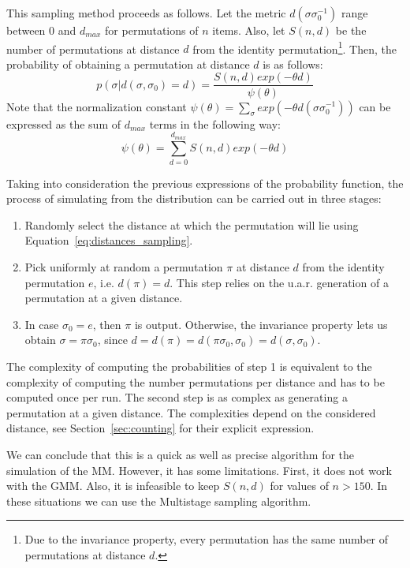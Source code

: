 \documentclass[article,nojss]{jss}
\begin{document}
This sampling method proceeds as follows. Let the metric $d(\sigma \sigma_0^{-1})$ range between  $0$ and $d_{max}$ for permutations of $n$ items. Also, let $S(n,d)$ be the number of permutations at distance $d$ from the identity permutation\footnote{Due to the invariance property, every permutation has the same number of permutations at distance $d$.}. Then, the probability of obtaining a permutation at distance $d$ is as follows:
\begin{equation}
p(\sigma | d(\sigma, \sigma_0)=d) = \frac{S(n,d) exp(-\theta d) }{\psi(\theta)}
\label{eq:distances_sampling}
\end{equation}
Note that the normalization constant $\psi(\theta)=\sum _{ \sigma}  exp({-\theta d(\sigma \sigma_0^{-1})})$ can be expressed as the sum of $d_{max}$ terms in the following way:
\begin{equation}
\psi(\theta) = \sum _{d=0}^{d_{max}} S(n,d) exp(-\theta d)
\nonumber
\end{equation}

Taking into consideration the previous expressions of the probability function, the process of simulating from the distribution can be carried out in three stages: 
\begin{enumerate}
	\item Randomly select the distance at which the permutation will lie using Equation~\eqref{eq:distances_sampling}. 
	\item Pick uniformly at random a  permutation $\pi$ at distance $d$ from the identity permutation $e$, i.e. $d(\pi)=d$. This step relies on the u.a.r. generation of a permutation at a given distance. 
	\item In case $\sigma_0= e$, then $\pi$ is output. Otherwise, the invariance property lets us obtain $\sigma = \pi \sigma_0$, since $d=d(\pi)=d(\pi \sigma_0, \sigma_0)=d(\sigma, \sigma_0)$.
\end{enumerate}

The complexity of computing the probabilities of step 1 is equivalent to the complexity of computing the number permutations per distance and has to be computed once per run. The second step is as complex as generating a permutation at a given distance. The complexities depend on the considered distance, see Section~\ref{sec:counting} for their explicit expression. 

We can conclude that this is a quick as well as precise algorithm for the simulation of the MM. However, it has some limitations. First, it does not work with the GMM. Also, it is infeasible to keep $S(n,d)$ for values of $n>150$. In these situations we can use the Multistage sampling algorithm.
\end{document}
